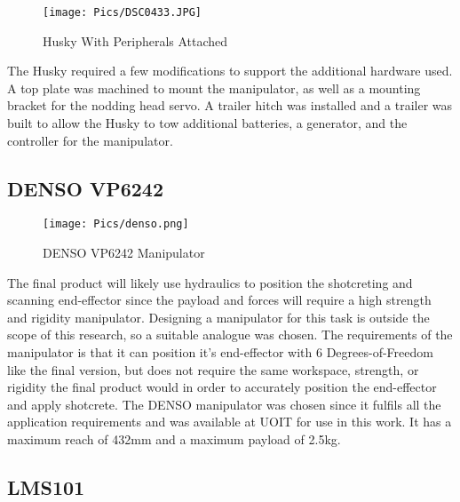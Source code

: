 \begin{figure}[H]
    \centering
    \texttt{[image: Pics/DSC0433.JPG]}
    \caption{Husky With Peripherals Attached}
    \label{fig:peripherals}
\end{figure}
The Husky required a few modifications to support the additional hardware used. A top plate was machined to mount the manipulator, as well as a mounting bracket for the nodding head servo. A trailer hitch was installed and a trailer was built to allow the Husky to tow additional batteries, a generator, and the controller for the manipulator.\\
\subsection{DENSO VP6242}
\begin{figure}[H]
    \centering
    \texttt{[image: Pics/denso.png]}
    \caption{DENSO VP6242 Manipulator \cite{densopage}}
    \label{fig:sick}
\end{figure}
The final product will likely use hydraulics to position the shotcreting and scanning end-effector since the payload and forces will require a high strength and rigidity manipulator. Designing a manipulator for this task is outside the scope of this research, so a suitable analogue was chosen. The requirements of the manipulator is that it can position it's end-effector with 6 Degrees-of-Freedom like the final version, but does not require the same workspace, strength, or rigidity the final product would in order to accurately position the end-effector and apply shotcrete. The DENSO manipulator was chosen since it fulfils all the application requirements and was available at UOIT for use in this work. It has a maximum reach of 432mm and a maximum payload of 2.5kg.\\ 
\subsection{LMS101}

